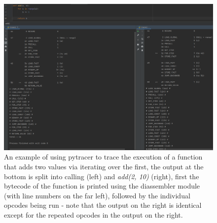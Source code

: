 \begin{figure}[H]
    \centering
    \includegraphics[width=12cm]{figures/introduction/tracer_example}
    \caption{An example of using pytracer to trace the execution of a function that adds two values via iterating over
    the first, the output at the bottom is split into calling  (left) and \textit{add(2, 10)} (right),
    first the bytecode of the function is printed using the diassembler module (with line numbers on the far left),
        followed by the individual opcodes being run - note that the output on the right is identical except for the
    repeated opcodes in the output on the right.}
    \label{fig:pytracer_example}
\end{figure}